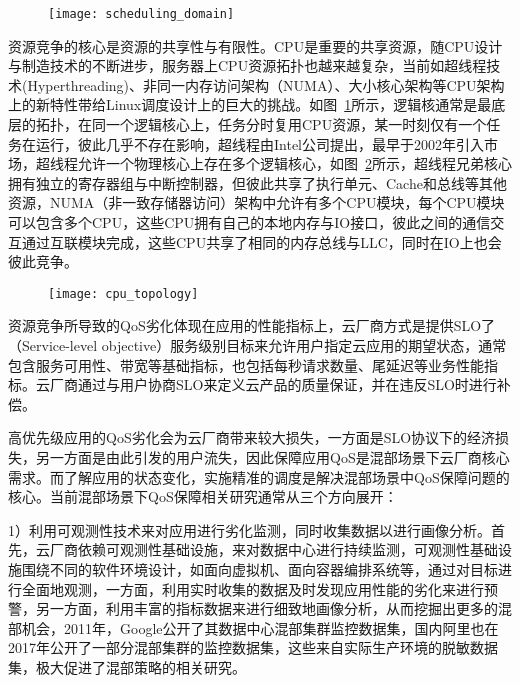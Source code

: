 \begin{figure}[!htbp]
    \centering
    \texttt{[image: scheduling\_domain]}
    \label{fig:scheduling_domain}
\end{figure}

资源竞争的核心是资源的共享性与有限性。CPU是重要的共享资源，随CPU设计与制造技术的不断进步，服务器上CPU资源拓扑也越来越复杂，当前如超线程技术(Hyperthreading)、非同一内存访问架构（NUMA）、大小核心架构等CPU架构上的新特性带给Linux调度设计上的巨大的挑战。如图~\ref{fig:scheduling_domain}所示，逻辑核通常是最底层的拓扑，在同一个逻辑核心上，任务分时复用CPU资源，某一时刻仅有一个任务在运行，彼此几乎不存在影响，超线程由Intel公司提出，最早于2002年引入市场，超线程允许一个物理核心上存在多个逻辑核心，如图~\ref{fig:cpu_topology}所示，超线程兄弟核心拥有独立的寄存器组与中断控制器，但彼此共享了执行单元、Cache和总线等其他资源，NUMA（非一致存储器访问）架构中允许有多个CPU模块，每个CPU模块可以包含多个CPU，这些CPU拥有自己的本地内存与IO接口，彼此之间的通信交互通过互联模块完成，这些CPU共享了相同的内存总线与LLC，同时在IO上也会彼此竞争。

\begin{figure}[!htbp]
    \centering
    \texttt{[image: cpu\_topology]}
    \label{fig:cpu_topology}
\end{figure}

资源竞争所导致的QoS劣化体现在应用的性能指标上，云厂商方式是提供SLO了（Service-level objective）服务级别目标来允许用户指定云应用的期望状态，通常包含服务可用性、带宽等基础指标，也包括每秒请求数量、尾延迟等业务性能指标。云厂商通过与用户协商SLO来定义云产品的质量保证，并在违反SLO时进行补偿。

高优先级应用的QoS劣化会为云厂商带来较大损失，一方面是SLO协议下的经济损失，另一方面是由此引发的用户流失，因此保障应用QoS是混部场景下云厂商核心需求。而了解应用的状态变化，实施精准的调度是解决混部场景中QoS保障问题的核心。当前混部场景下QoS保障相关研究通常从三个方向展开：

1）利用可观测性技术来对应用进行劣化监测，同时收集数据以进行画像分析。首先，云厂商依赖可观测性基础设施，来对数据中心进行持续监测，可观测性基础设施围绕不同的软件环境设计，如面向虚拟机、面向容器编排系统等，通过对目标进行全面地观测，一方面，利用实时收集的数据及时发现应用性能的劣化来进行预警，另一方面，利用丰富的指标数据来进行细致地画像分析，从而挖掘出更多的混部机会，2011年，Google公开了其数据中心混部集群监控数据集，国内阿里也在2017年公开了一部分混部集群的监控数据集\citep{guo2019limits}，这些来自实际生产环境的脱敏数据集，极大促进了混部策略的相关研究。

